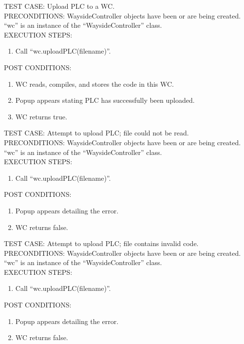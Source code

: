 \documentclass{scrreprt}
\begin{document}
        TEST CASE: Upload PLC to a WC.\\
        PRECONDITIONS: WaysideController objects have been or are being created.
        ``wc'' is an instance of the ``WaysideController'' class.\\
        EXECUTION STEPS: \begin{enumerate}
            \item Call ``wc.uploadPLC(filename)''.
        \end{enumerate}
        POST CONDITIONS: \begin{enumerate}
            \item WC reads, compiles, and stores the code in this WC.
            \item Popup appears stating PLC has successfully been uploaded.
            \item WC returns true.
        \end{enumerate}

        TEST CASE: Attempt to upload PLC; file could not be read.\\
        PRECONDITIONS: WaysideController objects have been or are being created.
        ``wc'' is an instance of the ``WaysideController'' class.\\
        EXECUTION STEPS: \begin{enumerate}
            \item Call ``wc.uploadPLC(filename)''.
        \end{enumerate}
        POST CONDITIONS: \begin{enumerate}
            \item Popup appears detailing the error.
            \item WC returns false.
        \end{enumerate}

        TEST CASE: Attempt to upload PLC; file contains invalid code.\\
        PRECONDITIONS: WaysideController objects have been or are being created.
        ``wc'' is an instance of the ``WaysideController'' class.\\
        EXECUTION STEPS: \begin{enumerate}
            \item Call ``wc.uploadPLC(filename)''.
        \end{enumerate}
        POST CONDITIONS: \begin{enumerate}
            \item Popup appears detailing the error.
            \item WC returns false.
        \end{enumerate}
\end{document}
